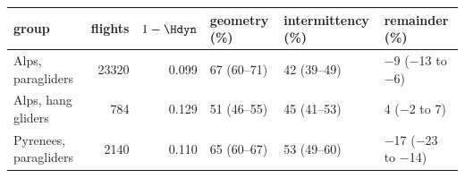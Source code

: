 \begin{tabular}{lrrlll}
\toprule
group & flights & $1-\Hdyn$ & geometry (\%) & intermittency (\%) & remainder (\%) \\
\midrule
Alps, paragliders & 23320 & 0.099 & 67 (60--71) & 42 (39--49) & $-$9 ($-$13 to $-$6) \\
Alps, hang gliders & 784 & 0.129 & 51 (46--55) & 45 (41--53) & 4 ($-$2 to 7) \\
Pyrenees, paragliders & 2140 & 0.110 & 65 (60--67) & 53 (49--60) & $-$17 ($-$23 to $-$14) \\
\bottomrule
\end{tabular}
